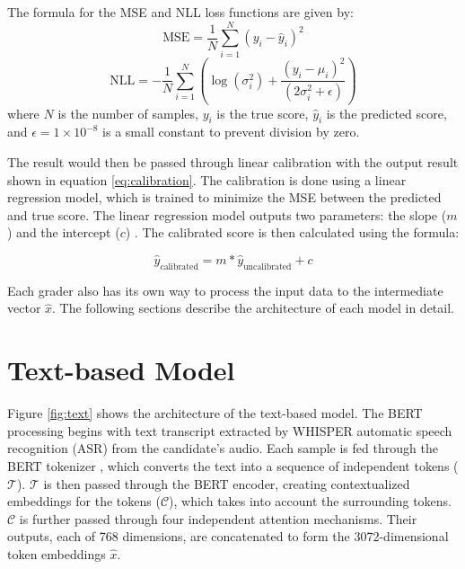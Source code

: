 The formula for the MSE and NLL loss functions are given by:
\begin{equation} \label{eq:mse}
    \text{MSE} = \frac{1}{N} \sum_{i=1}^{N} (y_i - \hat{y}_i)^2
\end{equation}
\begin{equation} \label{eq:nll}
    \text{NLL} = -\frac{1}{N} \sum_{i=1}^{N} \left( \log(\sigma_i^2) + \frac{(y_i - \mu_i)^2}{(2\sigma_i^2 + \epsilon)} \right)
\end{equation}
where $N$ is the number of samples, $y_i$ is the true score,  $\hat{y}_i$ is the predicted score, and $\epsilon = 1\times10^{-8}$ is a small constant to prevent division by zero.

The result would then be passed through linear calibration with the output result shown in equation \ref{eq:calibration}. The calibration is done using a linear regression model, which is trained to minimize the MSE between the predicted and true score. The linear regression model outputs two parameters: the slope ($m$)  and the intercept ($c$) . The calibrated score is then calculated using the formula:

\begin{equation}
    \hat{y}_{\text{calibrated}} = m*\hat{y}_{\text{uncalibrated}} + c
    \label{eq:calibration}
\end{equation}

Each grader also has its own way to process the input data to the intermediate vector $\hat{x}$. The following sections describe the architecture of each model in detail.

\section{Text-based Model}
Figure \ref{fig:text} shows the architecture of the text-based model. The BERT processing begins with text transcript extracted by WHISPER automatic speech recognition (ASR) from the candidate's audio. Each sample is fed through the BERT tokenizer , which converts the text into a sequence of independent tokens ($\mathcal{T}$). $\mathcal{T}$ is then passed through the BERT encoder, creating contextualized embeddings for the tokens ($\mathcal{C}$), which takes into account the surrounding tokens. $\mathcal{C}$ is further passed through four independent attention mechanisms. Their outputs, each of 768 dimensions, are concatenated to form the 3072-dimensional token embeddings $\hat{x}$.

